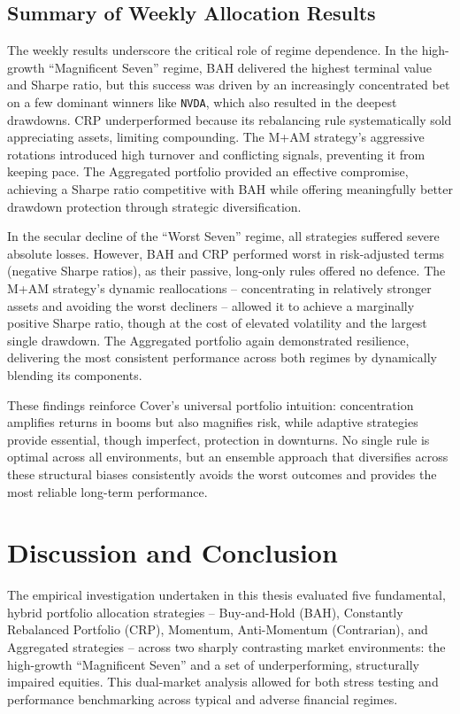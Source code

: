 \documentclass[12pt,a4paper]{report}
\begin{document}
\section{Summary of Weekly Allocation Results}

The weekly results underscore the critical role of regime dependence. In the high-growth ``Magnificent Seven'' regime, BAH delivered the highest terminal value and Sharpe ratio, but this success was driven by an increasingly concentrated bet on a few dominant winners like \texttt{NVDA}, which also resulted in the deepest drawdowns. CRP underperformed because its rebalancing rule systematically sold appreciating assets, limiting compounding. The M+AM strategy's aggressive rotations introduced high turnover and conflicting signals, preventing it from keeping pace. The Aggregated portfolio provided an effective compromise, achieving a Sharpe ratio competitive with BAH while offering meaningfully better drawdown protection through strategic diversification.

In the secular decline of the ``Worst Seven'' regime, all strategies suffered severe absolute losses. However, BAH and CRP performed worst in risk-adjusted terms (negative Sharpe ratios), as their passive, long-only rules offered no defence. The M+AM strategy's dynamic reallocations -- concentrating in relatively stronger assets and avoiding the worst decliners -- allowed it to achieve a marginally positive Sharpe ratio, though at the cost of elevated volatility and the largest single drawdown. The Aggregated portfolio again demonstrated resilience, delivering the most consistent performance across both regimes by dynamically blending its components.

These findings reinforce Cover’s universal portfolio intuition: concentration amplifies returns in booms but also magnifies risk, while adaptive strategies provide essential, though imperfect, protection in downturns. No single rule is optimal across all environments, but an ensemble approach that diversifies across these structural biases consistently avoids the worst outcomes and provides the most reliable long-term performance.

\chapter{Discussion and Conclusion}

The empirical investigation undertaken in this thesis evaluated five fundamental, hybrid portfolio allocation strategies -- Buy-and-Hold (BAH), Constantly Rebalanced Portfolio (CRP), Momentum, Anti-Momentum (Contrarian), and Aggregated strategies -- across two sharply contrasting market environments: the high-growth “Magnificent Seven” and a set of underperforming, structurally impaired equities. This dual-market analysis allowed for both stress testing and performance benchmarking across typical and adverse financial regimes. 
\end{document}
